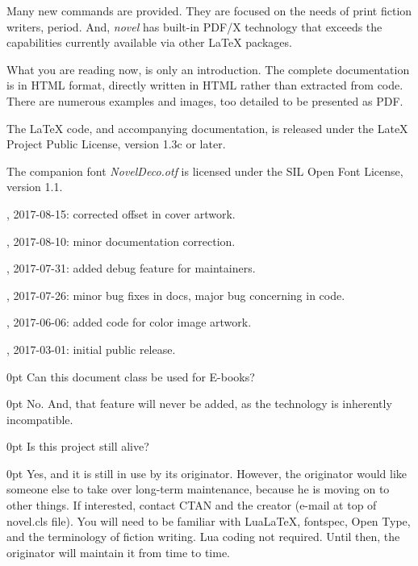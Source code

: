 \documentclass{novel} %
\begin{document}
Many new commands are provided. They are focused on the
needs of print fiction writers, period. And, \emph{novel} has built-in PDF/X
technology that exceeds the capabilities currently available via other
LaTeX packages.


What you are reading now, is only an introduction. The complete
documentation is in HTML format, directly written
in HTML rather than extracted from code. There are numerous
examples and images, too detailed to be presented as PDF.


The LaTeX code, and accompanying documentation, is released
under the LateX Project Public License, version 1.3c or later.

The companion font \emph{NovelDeco.otf} is licensed under the SIL
Open Font License, version 1.1.


, 2017-08-15: corrected offset in cover artwork.

, 2017-08-10: minor documentation correction.

, 2017-07-31: added debug feature for maintainers.

, 2017-07-26: minor bug fixes in docs, major bug concerning \string\textls\space in code.

, 2017-06-06: added code for color image artwork.

, 2017-03-01: initial public release.

\clearpage


\begin{adjustwidth}{\parindent}{0pt}
\backindent{}Can this document class be used for E-books?
\end{adjustwidth}
\begin{adjustwidth}{\parindent}{0pt}
\backindent{}No. And, that feature will never be added, as the technology
is inherently incompatible.
\end{adjustwidth}

\begin{adjustwidth}{\parindent}{0pt}
\backindent{}Is this project still alive?
\end{adjustwidth}
\begin{adjustwidth}{\parindent}{0pt}
\backindent{}Yes, and it is still in use by its originator. However, the originator would like someone else to take over long-term maintenance, because he is moving on to other things. If interested, contact CTAN and the creator (e-mail at top of novel.cls file). You will need to be familiar with LuaLaTeX, fontspec, Open Type, and the terminology of fiction writing. Lua coding not required. Until then, the originator will maintain it from time to time.
\end{adjustwidth}
\end{document}
